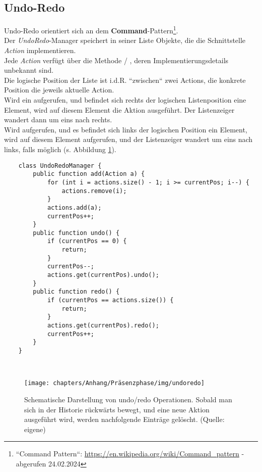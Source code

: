 \subsection*{Undo-Redo}

Undo-Redo orientiert sich an dem \textbf{Command}-Pattern\footnote{
    ``Command Pattern``: \url{https://en.wikipedia.org/wiki/Command_pattern} - abgerufen 24.02.2024
}.\\
Der \textit{UndoRedo}-Manager speichert in seiner Liste Objekte, die die Schnittstelle \textit{Action} implementieren.\\
Jede \textit{Action} verfügt über die Methode  / , deren Implementierungsdetails unbekannt sind.\\
Die logische Position der Liste ist i.d.R. ``zwischen`` zwei Actions, die konkrete Position die jeweils aktuelle Action.\\
Wird ein  aufgerufen, und befindet sich rechts der logischen Listenposition eine Element, wird auf diesem Element die Aktion  ausgeführt.
Der Listenzeiger wandert dann um eins nach rechts.\\
Wird  aufgerufen, und es befindet sich links der logischen Position ein Element, wird auf diesem Element  aufgerufen, und der Listenzeiger wandert um eins nach links, falls möglich (s. Abbildung \ref{fig:undoredo}).

\begin{verbatim}
    class UndoRedoManager {
        public function add(Action a) {
            for (int i = actions.size() - 1; i >= currentPos; i--) {
                actions.remove(i);
            }
            actions.add(a);
            currentPos++;
        }
        public function undo() {
            if (currentPos == 0) {
                return;
            }
            currentPos--;
            actions.get(currentPos).undo();
        }
        public function redo() {
            if (currentPos == actions.size()) {
                return;
            }
            actions.get(currentPos).redo();
            currentPos++;
        }
    }
\end{verbatim}\\

\begin{figure}
    \centering
    \texttt{[image: chapters/Anhang/Präsenzphase/img/undoredo]}
    \caption{Schematische Darstellung von undo/redo Operationen. Sobald man sich in der Historie rückwärts bewegt, und eine neue Aktion ausgeführt wird, werden nachfolgende Einträge gelöscht. (Quelle: eigene)}
    \label{fig:undoredo}
\end{figure}
